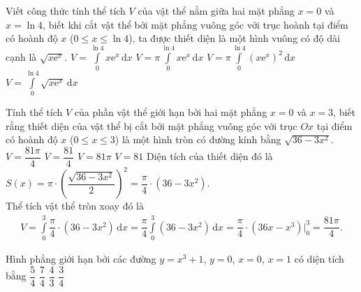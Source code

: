 \begin{ex}%
	Viết công thức tính thể tích $V$ của vật thể nằm giữa hai mặt phẳng $x=0$ và $x=\ln 4$, biết khi cắt vật thể bởi mặt phẳng vuông góc với trục hoành tại điểm có hoành độ $x$ ($0\le x\le \ln 4$), ta được thiết diện là một hình vuông có độ dài cạnh là $\sqrt{x\mathrm{e}^x}$.
	\choice
	{\True $V=\displaystyle\int\limits_0^{\ln 4}x\mathrm{e}^x\mathrm{\,d}x$}
	{$V=\pi\displaystyle\int\limits_0^{\ln 4}x\mathrm{e}^x\mathrm{\,d}x$}
	{$V=\pi\displaystyle\int\limits_0^{\ln 4}\left(x\mathrm{e}^x\right)^2\mathrm{\,d}x$}
	{$V=\displaystyle\int\limits_0^{\ln 4}\sqrt{x\mathrm{e}^x}\mathrm{\,d}x$}
\end{ex}
\begin{ex}%
	Tính thể tích $V$ của phần vật thể giới hạn bởi hai mặt phẳng $x=0$ và $x=3$, biết rằng thiết diện của vật thể bị cắt bởi mặt phẳng vuông góc với trục $Ox$ tại điểm có hoành độ $x$ ($0\leq x \leq 3$) là một hình tròn có đường kính bằng $\sqrt{36-3x^2}$.
	\choice
	{\True $V=\dfrac{81\pi}{4}$}
	{$V=\dfrac{81}{4}$}
	{$V=81\pi$}
	{$V=81$}
	\loigiai
	{
		Diện tích của thiết diện đó là $S(x)=\pi\cdot \left(\dfrac{\sqrt{36-3x^2}}{2}\right)^2 = \dfrac{\pi}{4}\cdot(36-3x^2)$.\\
		Thể tích vật thể tròn xoay đó là
		\begin{eqnarray*}
			V=\displaystyle\int\limits_0^3\dfrac{\pi}{4}\cdot(36-3x^2)\mathrm{\,d}x = \dfrac{\pi}{4} \displaystyle\int\limits_0^3(36-3x^2)\mathrm{\,d}x = \dfrac{\pi}{4}\cdot(36x-x^3)\bigg|_0^3 = \dfrac{81\pi}{4}.
		\end{eqnarray*}
	}
\end{ex}
\begin{ex}%
	Hình phẳng giới hạn bởi các đường $y=x^3+1$, $y=0$, $x=0$, $x=1$ có diện tích bằng
	\choice
	{\True $\dfrac{5}{4}$}
	{$\dfrac{7}{4}$}
	{$\dfrac{4}{3}$}
	{$\dfrac{3}{4}$}
\end{ex}
